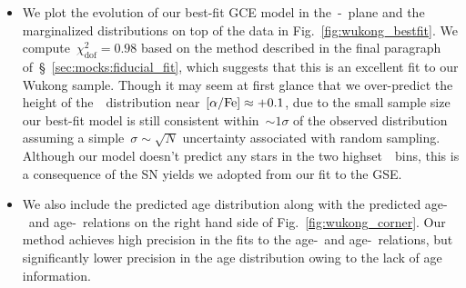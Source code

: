 \documentclass[ms.tex]{subfiles}
\begin{document}
\begin{itemize}
	\item We plot the evolution of our best-fit GCE model in the~\afe-\feh~plane
	and the marginalized distributions on top of the data in
	Fig.~\ref{fig:wukong_bestfit}.
	We compute~$\chi_\text{dof}^2 = 0.98$ based on the method described in the
	final paragraph of~\S~\ref{sec:mocks:fiducial_fit}, which suggests that
	this is an excellent fit to our Wukong sample.
	Though it may seem at first glance that we over-predict the height of
	the~\afe~distribution near~$\text{[$\alpha$/Fe]} \approx +0.1$, due to the small sample
	size our best-fit model is still consistent within~$\sim1\sigma$ of the
	observed distribution assuming a simple~$\sigma\sim\sqrt{N}$ uncertainty
	associated with random sampling.
	Although our model doesn't predict any stars in the two highset~\afe~bins,
	this is a consequence of the SN yields we adopted from our fit to the GSE.
	
	\item We also include the predicted age distribution along with the
	predicted age-\feh~and age-\afe~relations on the right hand side of
	Fig.~\ref{fig:wukong_corner}.
	Our method achieves high precision in the fits to the age-\feh~and
	age-\afe~relations, but significantly lower precision in the age
	distribution owing to the lack of age information.

\end{itemize}
\end{document}

